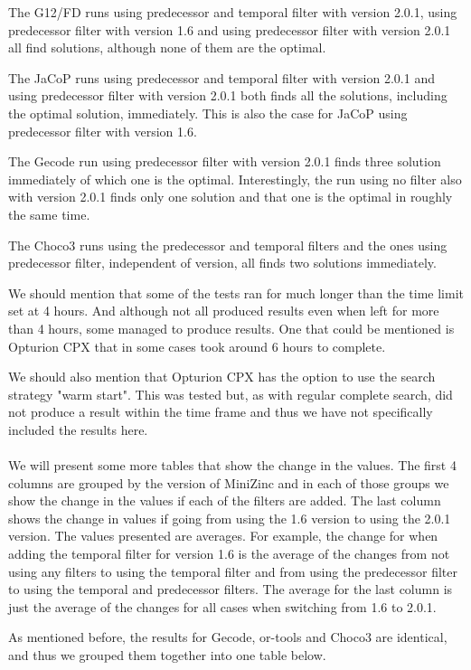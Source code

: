 The G12/FD runs using predecessor and temporal filter with version 2.0.1, using predecessor filter with version 1.6 and using predecessor filter with version 2.0.1 all find solutions, although none of them are the optimal.

The JaCoP runs using predecessor and temporal filter with version 2.0.1 and using predecessor filter with version 2.0.1 both finds all the solutions, including the optimal solution, immediately. This is also the case for JaCoP using predecessor filter with version 1.6.

The Gecode run using predecessor filter with version 2.0.1 finds three solution immediately of which one is the optimal. Interestingly, the run using no filter also with version 2.0.1 finds only one solution and that one is the optimal in roughly the same time.

The Choco3 runs using the predecessor and temporal filters and the ones using predecessor filter, independent of version, all finds two solutions immediately.

We should mention that some of the tests ran for much longer than the time limit set at 4 hours. And although not all produced results even when left for more than 4 hours, some managed to produce results. One that could be mentioned is Opturion CPX that in some cases took around 6 hours to complete.

We should also mention that Opturion CPX has the option to use the search strategy "warm start". This was tested but, as with regular complete search, did not produce a result within the time frame and thus we have not specifically included the results here.
\\\\
We will present some more tables that show the change in the values. The first 4 columns are grouped by the version of MiniZinc and in each of those groups we show the change in the values if each of the filters are added. The last column shows the change in values if going from using the 1.6 version to using the 2.0.1 version. The values presented are averages. For example, the change for when adding the temporal filter for version 1.6 is the average of the changes from not using any filters to using the temporal filter and from using the predecessor filter to using the temporal and predecessor filters. The average for the last column is just the average of the changes for all cases when switching from 1.6 to 2.0.1.

As mentioned before, the results for Gecode, or-tools and Choco3 are identical, and thus we grouped them together into one table below.

